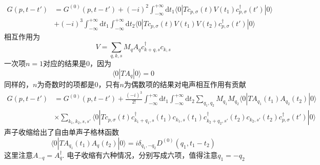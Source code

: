 \documentclass[a4paper,14pt]{article}
\begin{document}
\begin{equation*}
    \begin{split}
        G(p,t-t')&=G^{(0)}(p,t-t')+(-i)^2\int_{-\infty}^{+\infty}\mathrm{d}t_1\langle0|Tc_{p,\sigma}(t)V(t_1)c_{p,\sigma}^\dagger(t')|0\rangle\\
        &+(-i)^3\int_{-\infty}^{+\infty}\mathrm{d}t_1\int_{-\infty}^{+\infty}\mathrm{d}t_2\langle0|Tc_{p,\sigma}(t)V(t_1)V(t_2)c_{p,\sigma}^\dagger(t')|0\rangle
    \end{split}
\end{equation*}
相互作用为
\begin{equation*}
    V=\sum_{q,k,s}M_qA_qc_{k+q,s}^\dagger c_{k,s}
\end{equation*}
一次项$n=1$对应的结果是$0$，因为
\begin{equation*}
    \langle0|TA_q|0\rangle=0
\end{equation*}
同样的，$n$为奇数时的项都是$0$，只有$n$为偶数项的结果对电声相互作用有贡献
\begin{equation*}
    \begin{split}
        G(p,t-t')&=G^{(0)}(p,t-t')+\frac{(-i)^3}{2!}\int_{-\infty}^{+\infty}\mathrm{d}t_1\int_{-\infty}^{+\infty}\mathrm{d}t_2\sum_{q_1,q_2}M_{q_1}M_{q_2}\langle0|TA_{q_1}(t_1)A_{q_2}(t_2)|0\rangle\\
        &\times\sum_{k_1,k_2,s,s'}\langle0|Tc_{p,\sigma}(t)c_{k_1+q_1,s}^\dagger(t_1)c_{k_1,s}(t_1)c_{k_2+q_2,s'}^\dagger(t_2)c_{k_2,s'}(t_2)c_{p,\sigma}^\dagger(t')|0\rangle
    \end{split}
\end{equation*}
声子收缩给出了自由单声子格林函数
\begin{equation*}
    \langle0|TA_{q_1}(t_1)A_q(t_2)|0\rangle=i\delta_{q_1,-q_2}D^{(0)}(q_1,t_1-t_2)
\end{equation*}
这里注意$A_{-q}=A_q^\dagger$. 电子收缩有六种情况，分别写成六项，值得注意$q_1=-q_2$
\end{document}
